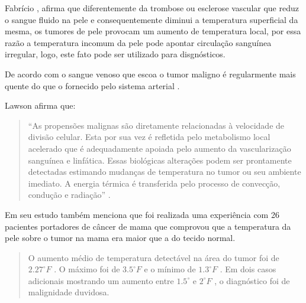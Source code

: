  Fabrício \cite{Fabricio}, afirma que diferentemente da trombose ou esclerose vascular que reduz o sangue  fluido na pele e consequentemente diminui a temperatura superficial da mesma, os tumores de pele provocam um aumento de temperatura local, por essa razão a temperatura incomum da pele pode apontar circulação sanguínea irregular, logo, este fato pode ser utilizado para disgnósticos.
 
 De acordo com \cite{Lawson} o sangue venoso que escoa o tumor maligno é regularmente mais quente  do que o fornecido pelo sistema arterial .
  
   Lawson afirma que:\begin{quotation} 
  
  ``As propensões malignas são diretamente relacionadas à velocidade de divisão celular. Esta por sua vez é refletida pelo metabolismo local acelerado que é adequadamente apoiada pelo aumento da vascularização sanguínea e linfática. Essas biológicas alterações podem ser prontamente detectadas estimando mudanças de temperatura no tumor ou seu ambiente imediato. A energia térmica é transferida pelo processo de convecção, condução e radiação''\cite[p.309]{Lawson} .\end{quotation}
 
  Em seu estudo \cite{Lawson} também menciona que foi realizada uma experiência com 26 pacientes portadores de câncer de mama que comprovou que a temperatura da pele sobre o tumor na mama era maior que a do tecido normal.%
\begin{quotation}
 O aumento médio de temperatura detectável na área do tumor foi de $ 2.27^{\circ}F$ . O máximo foi de $ 3.5^{\circ}F $ e o mínimo de $ 1.3^{\circ}F$ . Em dois casos adicionais mostrando um aumento entre $ 1.5^{\circ} $  e $ 2^{\circ}F$ , o diagnóstico foi de malignidade duvidosa\cite[p.309]{Lawson}.\end{quotation}%



